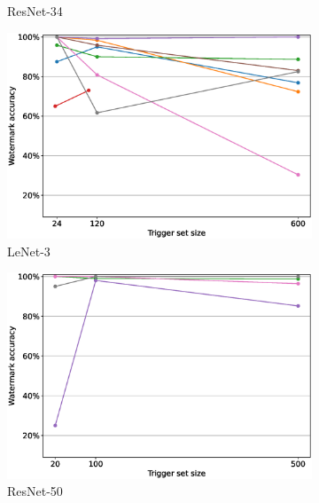 \begin{figure}
\begin{subfigure}{0.4\linewidth}
        \caption{ResNet-34}
        \label{fig:pruning-max-pr-rate-resnet34}
    \end{subfigure}
    \quad
    \begin{subfigure}{0.4\linewidth}
        \includegraphics[width=\linewidth]{images/pruning/lenet3_pruning_per_arch_maximal_pr_rate.eps}
        \caption{LeNet-3}
        \label{fig:pruning-max-pr-rate-lenet3}
    \end{subfigure}
    \quad
    \begin{subfigure}{0.4\linewidth}
        \includegraphics[width=\linewidth]{images/pruning/resnet50_pruning_per_arch_maximal_pr_rate.eps}
        \caption{ResNet-50}
        \label{fig:pruning-max-pr-rate-resnet50}
    \end{subfigure}
    \quad
    \begin{subfigure}{0.4\linewidth}

\end{subfigure}
\end{figure}
